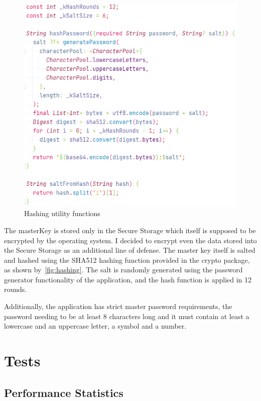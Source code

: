 \documentclass[a4paper,12pt]{report}
\begin{document}
\begin{figure}[H]
    \centering
    \includegraphics[scale=0.6]{images/code/hashing.png}
    \caption{Hashing utility functions}\label{fig:hashing}
\end{figure}

The masterKey is stored only in the Secure Storage which itself is supposed to
be encrypted by the operating system. I decided to encrypt even the data stored
into the Secure Storage as an additional line of defense. The master key itself
is salted and hashed using the SHA512 hashing function provided in the crypto
package\cite{cryptoDocs}, as shown by~\autoref{fig:hashing}. The salt is
randomly generated using the password generator functionality of the
application, and the hash function is applied in 12 rounds.

Additionally, the application has strict master password requirements, the
password needing to be at least 8 characters long and it must contain at least
a lowercase and an uppercase letter, a symbol and a number.

\chapter{Tests}

\section{Performance Statistics}
\end{document}
